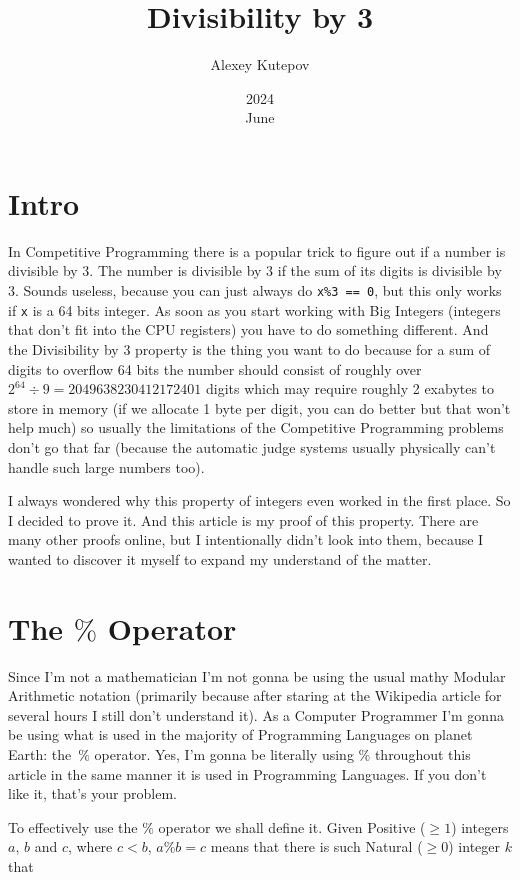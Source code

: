 \documentclass{article}
\title{Divisibility by 3}
\date{2024\\ June}
\author{Alexey Kutepov}
\begin{document}
\maketitle
\section{Intro}

In Competitive Programming there is a popular trick to figure out if a
number is divisible by 3. The number is divisible by 3 if the sum of
its digits is divisible by 3. Sounds useless, because you can just
always do \verb|x%3 == 0|, but this only works if \verb|x| is a 64
bits integer. As soon as you start working with Big Integers (integers
that don't fit into the CPU registers) you have to do something
different. And the Divisibility by 3 property is the thing you want to
do because for a sum of digits to overflow 64 bits the number should
consist of roughly over $2^{64} \div 9 = 2049638230412172401$ digits
which may require roughly 2 exabytes to store in memory (if we
allocate 1 byte per digit, you can do better but that won't help much)
so usually the limitations of the Competitive Programming problems
don't go that far (because the automatic judge systems usually
physically can't handle such large numbers too).

I always wondered why this property of integers even worked in the
first place. So I decided to prove it. And this article is my proof of
this property. There are many other proofs online, but I intentionally
didn't look into them, because I wanted to discover it myself to
expand my understand of the matter.

\section{The $\%$ Operator}

Since I'm not a mathematician I'm not gonna be using the usual mathy
Modular Arithmetic notation (primarily because after staring at the
Wikipedia article for several hours I still don't understand it). As a
Computer Programmer I'm gonna be using what is used in the majority of
Programming Languages on planet Earth: the $\%$ operator. Yes, I'm
gonna be literally using $\%$ throughout this article in the same
manner it is used in Programming Languages. If you don't like it,
that's your problem.

To effectively use the $\%$ operator we shall define it. Given
Positive ($\ge 1$) integers $a$, $b$ and $c$, where $c < b$, $a\%b =
c$ means that there is such Natural ($\ge 0$) integer $k$ that
\end{document}
